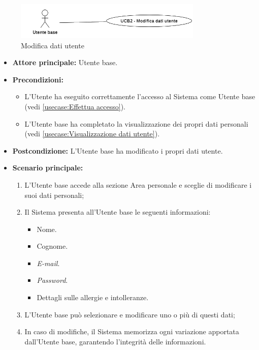 \label{usecase:Modifica dati utente}

\begin{figure}[h]
	\centering
	\includegraphics[width=0.8\textwidth]{./uml/UCB2.png} 
	\caption{Modifica dati utente}
	\label{fig:UCB2}
  \end{figure}

\begin{itemize}
	\item \textbf{Attore principale:} Utente base.

	\item \textbf{Precondizioni:}
	      \begin{itemize}
		      \item L'Utente ha eseguito correttamente l'accesso al Sistema come Utente base (vedi \autoref{usecase:Effettua accesso}).
		      \item L'Utente base ha completato la visualizzazione dei propri
		            dati personali (vedi \autoref{usecase:Visualizzazione dati utente}).
	      \end{itemize}

	\item \textbf{Postcondizione:} L'Utente base ha modificato i propri dati utente.

	\item \textbf{Scenario principale:}
	      \begin{enumerate}
		      \item L'Utente base accede alla sezione Area personale e sceglie di modificare i suoi dati personali;
		      \item Il Sistema presenta all'Utente base le seguenti informazioni:
		            \begin{itemize}
			            \item Nome.
			            \item Cognome.
			            \item \textit{E-mail}.
			            \item \textit{Password}.
			            \item Dettagli sulle allergie e intolleranze.
		            \end{itemize}
		      \item L'Utente base può selezionare e modificare uno o più di questi dati;
		      \item In caso di modifiche, il Sistema memorizza ogni variazione apportata dall'Utente base, garantendo l'integrità delle informazioni.
	      \end{enumerate}
\end{itemize}

